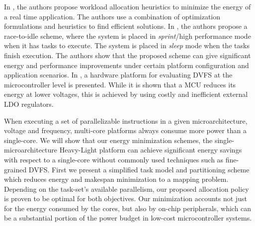 In \cite{Paterna}, the authors propose workload allocation heuristics to minimize the energy of a real time application. The authors use a combination of optimization formulations and heuristics to find efficient solutions. In \cite{Raghavan2012}, the authors propose a race-to-idle scheme, where the system is placed in \textit{sprint}/high performance mode when it has tasks to execute. The system is placed in \textit{sleep} mode when the tasks finish execution. The authors show that the proposed scheme can give significant energy and performance improvements under certain platform configuration and application scenarios. In \cite{Salehi2015}, a hardware platform for evaluating DVFS at the microcontroller level is presented. While it is shown that a MCU reduces its energy at lower voltages, this is achieved by using costly and inefficient external LDO regulators. 



When executing a set of parallelizable instructions in a given microarchitecture, voltage and frequency, multi-core platforms always consume more power than a single-core. We will show that our energy minimization schemes, the single-microarchitecture Heavy-Light platform can achieve significant energy savings with respect to a single-core without commonly used techniques such as fine-grained DVFS. 
First we present a simplified task model and partitioning scheme which reduces energy and makespan minimization to a mapping problem. Depending on the task-set's available parallelism, our proposed allocation policy is proven to be optimal for both objectives.
Our minimization accounts not just for the energy consumed by the cores, but also by on-chip peripherals, which can be a substantial portion of the power budget in low-cost microcontroller systems.
